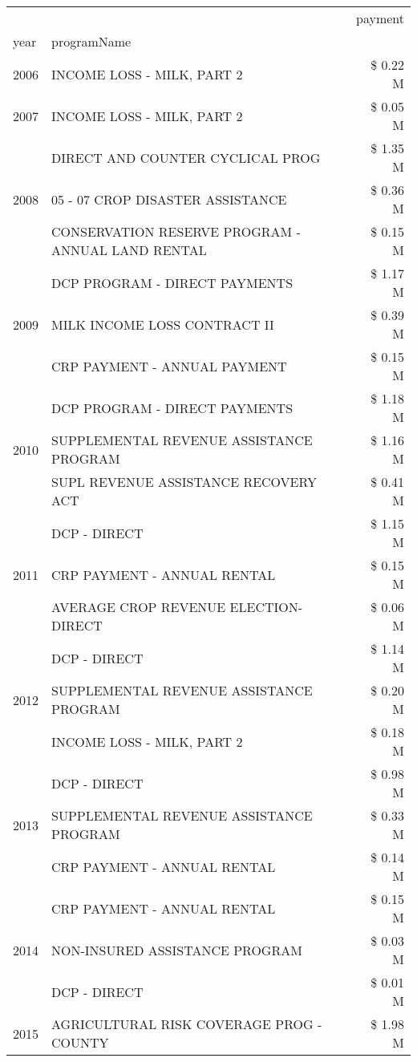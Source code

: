 \begin{tabular}{llr}
\toprule
 &  & payment \\
year & programName &  \\
\midrule
2006 & INCOME LOSS - MILK, PART 2 & \$ 0.22 M \\
\cline{1-3}
2007 & INCOME LOSS - MILK, PART 2 & \$ 0.05 M \\
\cline{1-3}
\multirow[t]{3}{*}{2008} & DIRECT AND COUNTER CYCLICAL PROG & \$ 1.35 M \\
 & 05 - 07 CROP DISASTER ASSISTANCE & \$ 0.36 M \\
 & CONSERVATION RESERVE PROGRAM - ANNUAL LAND RENTAL & \$ 0.15 M \\
\cline{1-3}
\multirow[t]{3}{*}{2009} & DCP PROGRAM - DIRECT PAYMENTS & \$ 1.17 M \\
 & MILK INCOME LOSS CONTRACT II & \$ 0.39 M \\
 & CRP PAYMENT - ANNUAL PAYMENT & \$ 0.15 M \\
\cline{1-3}
\multirow[t]{3}{*}{2010} & DCP PROGRAM - DIRECT PAYMENTS & \$ 1.18 M \\
 & SUPPLEMENTAL REVENUE ASSISTANCE PROGRAM & \$ 1.16 M \\
 & SUPL REVENUE ASSISTANCE RECOVERY ACT & \$ 0.41 M \\
\cline{1-3}
\multirow[t]{3}{*}{2011} & DCP - DIRECT & \$ 1.15 M \\
 & CRP PAYMENT - ANNUAL RENTAL & \$ 0.15 M \\
 & AVERAGE CROP REVENUE ELECTION-DIRECT & \$ 0.06 M \\
\cline{1-3}
\multirow[t]{3}{*}{2012} & DCP - DIRECT & \$ 1.14 M \\
 & SUPPLEMENTAL REVENUE ASSISTANCE PROGRAM & \$ 0.20 M \\
 & INCOME LOSS - MILK, PART 2 & \$ 0.18 M \\
\cline{1-3}
\multirow[t]{3}{*}{2013} & DCP - DIRECT & \$ 0.98 M \\
 & SUPPLEMENTAL REVENUE ASSISTANCE PROGRAM & \$ 0.33 M \\
 & CRP PAYMENT - ANNUAL RENTAL & \$ 0.14 M \\
\cline{1-3}
\multirow[t]{3}{*}{2014} & CRP PAYMENT - ANNUAL RENTAL & \$ 0.15 M \\
 & NON-INSURED ASSISTANCE PROGRAM & \$ 0.03 M \\
 & DCP - DIRECT & \$ 0.01 M \\
\cline{1-3}
\multirow[t]{3}{*}{2015} & AGRICULTURAL RISK COVERAGE PROG - COUNTY & \$ 1.98 M \\

\end{tabular}
